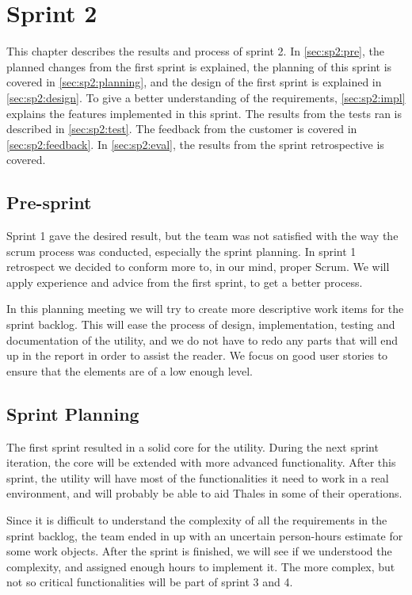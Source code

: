 \chapter{Sprint 2}
This chapter describes the results and process of sprint 2. In 
\autoref{sec:sp2:pre}, the planned changes from the first sprint is explained, 
the planning of this sprint is covered in \autoref{sec:sp2:planning}, and the 
design of the first sprint is explained in \autoref{sec:sp2:design}. To give a 
better understanding of the requirements, \autoref{sec:sp2:impl} explains the 
features implemented in this sprint. The results from the tests ran is 
described in \autoref{sec:sp2:test}. The feedback from the customer is covered 
in \autoref{sec:sp2:feedback}. In \autoref{sec:sp2:eval}, the results from the 
sprint retrospective is covered.

\section{Pre-sprint}
\label{sec:sp2:pre}
Sprint 1 gave the desired result, but the team was not satisfied with the way the \Gls{scrum} process was conducted, especially the sprint planning. In sprint 1 retrospect we decided to conform more to, in our mind, proper Scrum. We will apply experience and advice from the first sprint, to get a better process. 

In this planning meeting we will try to create more descriptive work items for the sprint backlog. This will ease the process of design, implementation, testing and documentation of the \gls{utility}, and we do not have to redo any parts that will end up in the report in order to assist the reader. We focus on good user stories to ensure that the elements are of a low enough level.


\section{Sprint Planning}
\label{sec:sp2:planning}
The first sprint resulted in a solid core for the \gls{utility}. During the next sprint iteration, the core will be extended with more advanced functionality. After this sprint, the \gls{utility} will have most of the functionalities it need to work in a real environment, and will probably be able to aid Thales in some of their operations.

Since it is difficult to understand the complexity of all the requirements in the sprint backlog, the team ended in up with an uncertain person-hours estimate for some work objects. After the sprint is finished, we will see if we understood the complexity, and assigned enough hours to implement it. The more complex, but not so critical functionalities will be part of sprint 3 and 4.   


